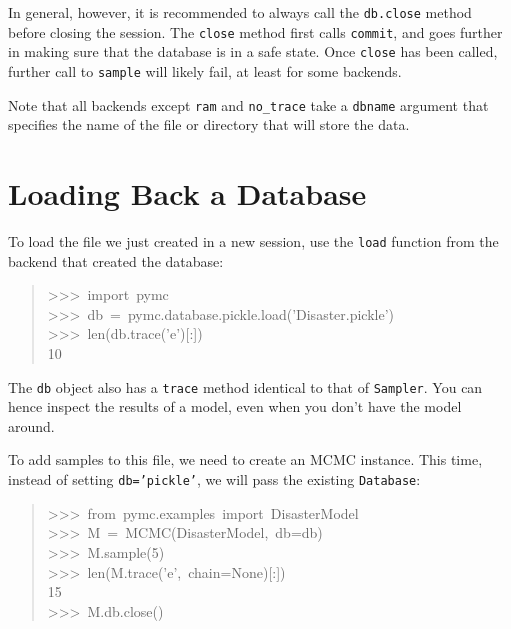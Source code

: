 In general, however, it is recommended to always call the \texttt{db.close} method
before closing the session. The \texttt{close} method first calls \texttt{commit}, and
goes further in making sure that the database is in a safe state. Once \texttt{close}
has been called, further call to \texttt{sample} will likely fail, at least
for some backends.
\begin{center}\begin{sffamily}
\end{sffamily}
\end{center}

Note that all backends except \texttt{ram} and \texttt{no{\_}trace} take a \texttt{dbname} argument that
specifies the name of the file or directory that will store the data.



\hypertarget{loading-back-a-database}{}
\section*{Loading Back a Database}
\label{loading-back-a-database}

To load the file we just created in a new session, use the \texttt{load} function
from the backend that created the database:

\begin{quote}{\ttfamily \raggedright \noindent
>{}>{}>~import~pymc~\\
>{}>{}>~db~=~pymc.database.pickle.load('Disaster.pickle')~\\
>{}>{}>~len(db.trace('e'){[}:{]})~\\
10
}\end{quote}

The \texttt{db} object also has a \texttt{trace} method identical to that of \texttt{Sampler}.
You can hence inspect the results of a model, even when you don't have the model
around.

To add samples to this file, we need to create an MCMC instance. This time,
instead of setting \texttt{db='pickle'}, we will pass the existing \texttt{Database}:
\begin{quote}{\ttfamily \raggedright \noindent
>{}>{}>~from~pymc.examples~import~DisasterModel~\\
>{}>{}>~M~=~MCMC(DisasterModel,~db=db)~\\
>{}>{}>~M.sample(5)~\\
>{}>{}>~len(M.trace('e',~chain=None){[}:{]})~\\
15~\\
>{}>{}>~M.db.close()
}\end{quote}

